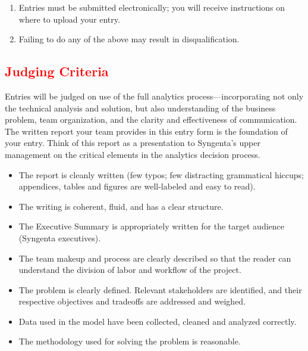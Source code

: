 \documentclass[11pt]{article} %
\begin{document}
{\begin{enumerate}
\item Entries must be submitted electronically; you will receive instructions on where to upload your entry. 

\item Failing to do any of the above may result in disqualification.

\end{enumerate}


\subsection*{\textcolor{red}{Judging Criteria}}

Entries will be judged on use of the full analytics process---incorporating 
not only the technical analysis and solution, but also understanding of the 
business problem, team organization, and the clarity and effectiveness of 
communication. The written report your team provides in this entry form is 
the foundation of your entry. Think of this report as a presentation to 
Syngenta's upper management on the critical elements in the analytics 
decision process. 

\begin{itemize}

\item The report is cleanly written (few typos; few distracting grammatical hiccups; appendices, tables and figures are well-labeled and easy to read).

\item The writing is coherent, fluid, and has a clear structure.

\item The Executive Summary is appropriately written for the target audience (Syngenta executives). 

\item The team makeup and process are clearly described so that the reader can understand the division of labor and workflow of the project.

\item The problem is clearly defined. Relevant stakeholders are identified, and their respective objectives and tradeoffs are addressed and weighed.

\item Data used in the model have been collected, cleaned and analyzed correctly.

\item The methodology used for solving the problem is reasonable.


\end{itemize}}
\end{document}
